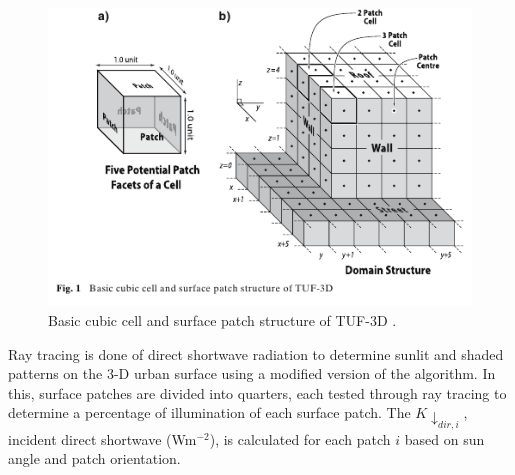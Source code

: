 \documentclass[preprint,12pt,authoryear]{elsarticle}
\begin{document}
\begin{figure}[!htbp]
\begin{center}
 \includegraphics[trim = 0mm 9mm 0mm 0mm, clip, scale=0.80]{images/TUF-3D-cubeStructure.png}
\end{center}
 \caption{Basic cubic cell and surface patch structure of TUF-3D \cite[p. 437]{Krayenhoff2007}.\label{fig:Tufcube}}\end{figure}

Ray tracing is done of direct shortwave radiation to determine sunlit and shaded patterns on the 3-D urban surface using a modified version of the \cite{Soux2004} algorithm. In this, surface patches are divided into quarters, each tested through ray tracing to determine a percentage of illumination of each surface patch. The $K\downarrow_{dir,i}$, incident direct shortwave (Wm$^{-2}$), is calculated for each patch $i$ based on sun angle and patch orientation.


%
%
%
\end{document}
